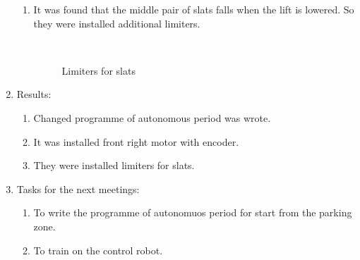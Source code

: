 \begin{enumerate}
\begin{enumerate}
	   \item It was found that the middle pair of slats falls when the lift is lowered. So they were installed additional limiters.
	   \begin{figure}[H]
	   	\begin{minipage}[h]{0.2\linewidth}
	   		\center  
	   	\end{minipage}
	   	\begin{minipage}[h]{0.6\linewidth}
	   		\caption{Limiters for slats}
	   	\end{minipage}
	   \end{figure}

	\end{enumerate}
	
	\item Results:
	\begin{enumerate}
		
		\item Changed programme of autonomous period was wrote.
		
		\item It was installed front right motor with encoder.
		
        \item They were installed limiters for slats.
		
	\end{enumerate}
	
	\item Tasks for the next meetings:
	\begin{enumerate}
		
		\item To write the programme of autonomuos period for start from the parking zone.
		
		\item To train on the control robot.
			
	\end{enumerate}
\end{enumerate}
\fillpage
